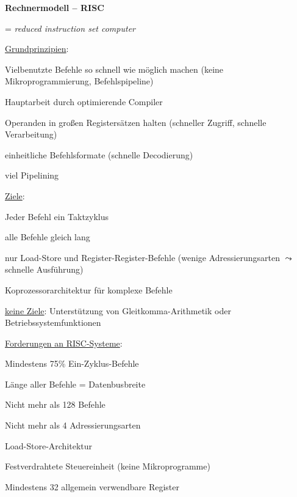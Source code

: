 \textbf{Rechnermodell -- RISC}
\begin{items}
	\item = \emph{reduced instruction set computer}
	\item \underline{Grundprinzipien}:
	\begin{enumeration}
	 	\item Vielbenutzte Befehle so schnell wie möglich machen (keine Mikroprogrammierung, Befehlspipeline)
	 	\item Hauptarbeit durch optimierende Compiler
	 	\item Operanden in großen Registersätzen halten (schneller Zugriff, schnelle Verarbeitung)
	 	\item einheitliche Befehlsformate (schnelle Decodierung)
	 	\item viel Pipelining
	 \end{enumeration}
	\item \underline{Ziele}:
	\begin{enumeration}
		\item Jeder Befehl ein Taktzyklus
		\item alle Befehle gleich lang
		\item nur Load-Store und Register-Register-Befehle (wenige Adressierungsarten $\leadsto$ schnelle Ausführung)
		\item Koprozessorarchitektur für komplexe Befehle
	\end{enumeration}
	\item \underline{keine Ziele}: Unterstützung von Gleitkomma-Arithmetik oder Betriebssystemfunktionen
	\item \underline{Forderungen an RISC-Systeme}: 
	\begin{enumeration}
		\item Mindestens 75\% Ein-Zyklus-Befehle
		\item Länge aller Befehle = Datenbusbreite
		\item Nicht mehr als 128 Befehle
		\item Nicht mehr als 4 Adressierungsarten
		\item Load-Store-Architektur
		\item Festverdrahtete Steuereinheit (keine Mikroprogramme)
		\item Mindestens 32 allgemein verwendbare Register
	\end{enumeration}
\end{items}

